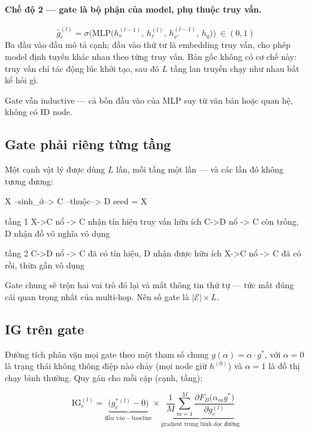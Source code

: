 \documentclass[11pt,a4paper]{article}
\begin{document}
\paragraph{Chế độ 2 --- gate là bộ phận của model, phụ thuộc truy vấn.}
\[
\hat g_e^{(l)}=\sigma\Big(\mathrm{MLP}\big(h_v^{(l-1)},\,h_r^{(l)},\,h_{v'}^{(l-1)},\,h_q
  \big)\Big)\ \in(0,1)
\]
Ba đầu vào đầu mô tả cạnh; đầu vào thứ tư là embedding truy vấn, cho phép model định tuyến
khác nhau theo từng truy vấn. Bản gốc không có cơ chế này: truy vấn chỉ tác động lúc khởi
tạo, sau đó $L$ tầng lan truyền chạy như nhau bất kể hỏi gì.

Gate vẫn inductive --- cả bốn đầu vào của MLP suy từ văn bản hoặc quan hệ, không có ID node.

\subsection{Gate phải riêng từng tầng}

Một cạnh vật lý được dùng $L$ lần, mỗi tầng một lần --- và các lần đó không tương đương:

\begin{dia}
X --sinh_ở--> C --thuộc--> D          seed = {X}

tầng 1   X->C nổ  ->  C nhận tín hiệu truy vấn         hữu ích
         C->D nổ  ->  C còn trống, D nhận đồ vô nghĩa  vô dụng

tầng 2   C->D nổ  ->  C đã có tín hiệu, D nhận được    hữu ích
         X->C nổ  ->  C đã có rồi, thừa                gần vô dụng
\end{dia}

Gate chung sẽ trộn hai vai trò đó lại và mất thông tin thứ tự --- tức mất đúng cái quan trọng nhất của multi-hop. Nên số gate là $|\mathcal{E}|\times L$.

\subsection{IG trên gate}

Đường tích phân vặn mọi gate theo một tham số chung $g(\alpha)=\alpha\cdot g^\ast$, với
$\alpha=0$ là trạng thái không thông điệp nào chảy (mọi node giữ $h^{(0)}$) và $\alpha=1$ là
đồ thị chạy bình thường. Quy gán cho mỗi cặp (cạnh, tầng):

\[
\mathrm{IG}_e^{(l)}
=\underbrace{\big(g^\ast_e{}^{(l)}-0\big)}_{\text{đầu vào}\,-\,\text{baseline}}
\times
\underbrace{\frac1M\sum_{m=1}^{M}\frac{\partial F_B\big(\alpha_m g^\ast\big)}{\partial g_e^{(l)}}}
  _{\text{gradient trung bình dọc đường}}
\]
\end{document}
